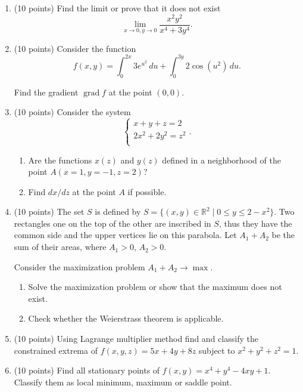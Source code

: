 \documentclass[12pt]{article} %
\theoremstyle{definition} %
\DeclareMathOperator{\grad}{grad}
\begin{document}
\begin{enumerate}

\item (10 points) Find the limit or prove that it does not exist
  \[
  \lim_{x \to 0, y \to 0} \frac{x^2 y^2}{x^4 + 3y^4}.
  \]
  

\item (10 points) Consider the function 
\[
f(x, y) = \int_0^{2x} 3e^{u^2} \, du  + \int_0^{3y} 2\cos(u^2) \, du.   
\]

Find the gradient $\grad f$ at the point $(0, 0)$.

\item (10 points) Consider the system 
  \[
  \begin{cases}
    x + y + z = 2 \\
    2x^2 + 2y^2 = z^2 \\
  \end{cases}.  
  \]
  \begin{enumerate}
    \item Are the functions $x(z)$ and $y(z)$ defined in a neighborhood of the point $A(x=1, y=-1, z=2)$?
    \item Find $dx/dz$ at the point $A$ if possible. 
  \end{enumerate}

\item (10 points)  
The set $S$ is defined by $S = \{(x, y) \in \mathbb{R}^2 \mid 0 \leq y \leq 2- x^2\}$. 
Two rectangles one on the top of the other are inscribed in $S$, 
thus they have the common side and the upper vertices lie on this parabola.
Let $A_1 + A_2$ be the sum of their areas, where $A_1 >0$, $A_2 >0$. 

Consider the maximization problem $A_1 + A_2 \to \max$.
\begin{enumerate}
  \item Solve the maximization problem or show that the maximum does not exist.
  \item Check whether the Weierstrass theorem is applicable.
\end{enumerate}

\item (10 points)  Using Lagrange multiplier method find and classify 
the constrained extrema of $f(x, y, z) =  5x +4y + 8z$ subject to $x^2 + y^2 + z^2 = 1$.

\item (10 points)  Find all stationary points of $f(x,y) = x^4 + y^4-4xy + 1$. 
Classify them as local minimum, maximum or saddle point.





\end{enumerate}
\end{document}
